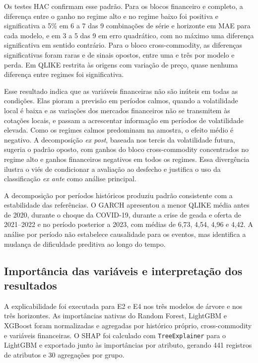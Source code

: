 \documentclass[a4paper,fleqn]{cas-sc}
\begin{document}
Os testes HAC confirmam esse padrão. Para os blocos financeiro e completo, a diferença entre o ganho no regime alto e no regime baixo foi positiva e significativa a 5\% em 6 a 7 das 9 combinações de série e horizonte em MAE para cada modelo, e em 3 a 5 das 9 em erro quadrático, com no máximo uma diferença significativa em sentido contrário. Para o bloco cross-commodity, as diferenças significativas foram raras e de sinais opostos, entre uma e três por modelo e perda. Em QLIKE restrita às origens com variação de preço, quase nenhuma diferença entre regimes foi significativa.

Esse resultado indica que as variáveis financeiras não são inúteis em todas as condições. Elas pioram a previsão em períodos calmos, quando a volatilidade local é baixa e as variações dos mercados financeiros não se transmitem às cotações locais, e passam a acrescentar informação em períodos de volatilidade elevada. Como os regimes calmos predominam na amostra, o efeito médio é negativo. A decomposição \textit{ex post}, baseada nos tercis da volatilidade futura, sugeria o padrão oposto, com ganhos do bloco cross-commodity concentrados no regime alto e ganhos financeiros negativos em todos os regimes. Essa divergência ilustra o viés de condicionar a avaliação ao desfecho e justifica o uso da classificação \textit{ex ante} como análise principal.

A decomposição por períodos históricos produziu padrão consistente com a estabilidade das referências. O GARCH apresentou a menor QLIKE média antes de 2020, durante o choque da COVID-19, durante a crise de geada e oferta de 2021--2022 e no período posterior a 2023, com médias de 6,73, 4,54, 4,96 e 4,42. A análise por período não estabelece causalidade para os eventos, mas identifica a mudança de dificuldade preditiva ao longo do tempo.

\subsection{Importância das variáveis e interpretação dos resultados}
\label{subsec:results_explainability}

A explicabilidade foi executada para E2 e E4 nos três modelos de árvore e nos três horizontes. As importâncias nativas do Random Forest, LightGBM e XGBoost foram normalizadas e agregadas por histórico próprio, cross-commodity e variáveis financeiras. O SHAP foi calculado com \texttt{TreeExplainer} para o LightGBM e exportado junto às importâncias por atributo, gerando 441 registros de atributos e 30 agregações por grupo.
\end{document}
